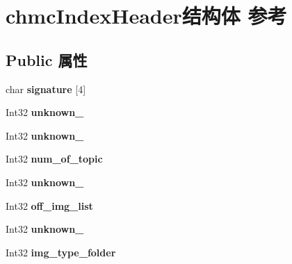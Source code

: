 \hypertarget{structchmc_index_header}{}\section{chmc\+Index\+Header结构体 参考}
\label{structchmc_index_header}
\subsection*{Public 属性}
\begin{DoxyCompactItemize}
\item 
\mbox{\label{structchmc_index_header_ab7691bd0fc534d74b9a4d85104dbbf66}} 
char {\bfseries signature} \mbox{[}4\mbox{]}
\item 
\mbox{\label{structchmc_index_header_a393c849d6fde2df4592a524259c2633c}} 
Int32 {\bfseries unknown\+\_}
\item 
\mbox{\label{structchmc_index_header_a44c852135aaae103eb992164e445d7ce}} 
Int32 {\bfseries unknown\+\_}
\item 
\mbox{\label{structchmc_index_header_a7971b640b58091562f258798c766cbd7}} 
Int32 {\bfseries num\+\_\+of\+\_\+topic}
\item 
\mbox{\label{structchmc_index_header_aed32a9a7946ac5a2cbf82b6a652afc5c}} 
Int32 {\bfseries unknown\+\_}
\item 
\mbox{\label{structchmc_index_header_a93b5b7fbb350636131bd9960bdf5fed3}} 
Int32 {\bfseries off\+\_\+img\+\_\+list}
\item 
\mbox{\label{structchmc_index_header_a869211e4350267ad757602deebc9f649}} 
Int32 {\bfseries unknown\+\_}
\item 
\mbox{\label{structchmc_index_header_ab04c9f92334977a9871e4366b233cd25}} 
Int32 {\bfseries img\+\_\+type\+\_\+folder}
\item 
\mbox{\label{structchmc_index_header_a73af24e0912789bcf4e4b7af5e999f79}} 

\end{DoxyCompactItemize}
